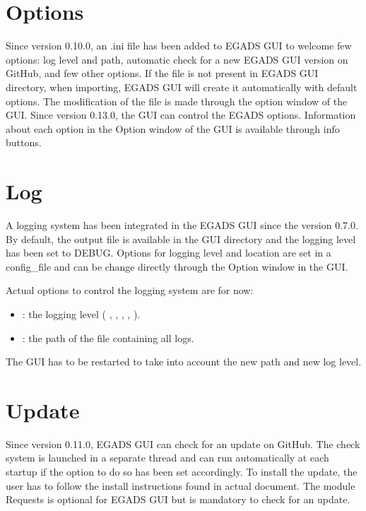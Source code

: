 \documentclass[a4paper,10pt,openany,english]{sphinxmanual}
\begin{document}
\section{Options}
\label{\detokenize{install:options}}
Since version 0.10.0, an .ini file has been added to EGADS GUI to welcome few options: log level and path, automatic check for a new EGADS GUI version on GitHub, and few other options. If the file is not present in EGADS GUI directory, when importing, EGADS GUI will create it automatically with default options. The modification of the file is made through the option window of the GUI. Since version 0.13.0, the GUI can control the EGADS options. Information about each option in the Option window of the GUI is available through info buttons.


\section{Log}
\label{\detokenize{install:log}}
A logging system has been integrated in the EGADS GUI since the version 0.7.0. By default, the output file is available in the GUI directory and the logging level has been set to DEBUG. Options for logging level and location are set in a config\_file  and can be change directly through the Option window in the GUI.

Actual options to control the logging system are for now:
\begin{itemize}
\item {} 
: the logging level ( , , , ,  ).

\item {} 
: the path of the file containing all logs.

\end{itemize}

The GUI has to be restarted to take into account the new path and new log level.


\section{Update}
\label{\detokenize{install:update}}
Since version 0.11.0, EGADS GUI can check for an update on GitHub. The check system is launched in a separate thread and can run automatically at each startup if the option to do so has been set accordingly. To install the update, the user has to follow the install instructions found in actual document. The module Requests is optional for EGADS GUI but is mandatory to check for an update.
\end{document}
